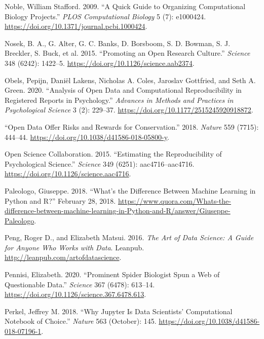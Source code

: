 \documentclass[
]{article}
\newlength{\cslhangindent}
\newenvironment{cslreferences}%
  {\setlength{\parindent}{0pt}%
  \everypar{\setlength{\hangindent}{\cslhangindent}}\ignorespaces}%
  {\par}
\begin{document}
\begin{cslreferences}
\leavevmode\hypertarget{ref-NobleQuickGuideOrganizing2009}{}%
Noble, William Stafford. 2009. ``A Quick Guide to Organizing Computational Biology Projects.'' \emph{PLOS Computational Biology} 5 (7): e1000424. \url{https://doi.org/10.1371/journal.pcbi.1000424}.

\leavevmode\hypertarget{ref-NosekPromotingOpenResearch2015}{}%
Nosek, B. A., G. Alter, G. C. Banks, D. Borsboom, S. D. Bowman, S. J. Breckler, S. Buck, et al. 2015. ``Promoting an Open Research Culture.'' \emph{Science} 348 (6242): 1422--5. \url{https://doi.org/10.1126/science.aab2374}.

\leavevmode\hypertarget{ref-ObelsAnalysisOpenData2020}{}%
Obels, Pepijn, Daniël Lakens, Nicholas A. Coles, Jaroslav Gottfried, and Seth A. Green. 2020. ``Analysis of Open Data and Computational Reproducibility in Registered Reports in Psychology.'' \emph{Advances in Methods and Practices in Psychological Science} 3 (2): 229--37. \url{https://doi.org/10.1177/2515245920918872}.

\leavevmode\hypertarget{ref-OpenDataOffer2018}{}%
``Open Data Offer Risks and Rewards for Conservation.'' 2018. \emph{Nature} 559 (7715): 444--44. \url{https://doi.org/10.1038/d41586-018-05800-y}.

\leavevmode\hypertarget{ref-OpenScienceCollaborationEstimatingReproducibilityPsychological2015}{}%
Open Science Collaboration. 2015. ``Estimating the Reproducibility of Psychological Science.'' \emph{Science} 349 (6251): aac4716--aac4716. \url{https://doi.org/10.1126/science.aac4716}.

\leavevmode\hypertarget{ref-PaleologoWhatDifferenceMachine2018}{}%
Paleologo, Giuseppe. 2018. ``What's the Difference Between Machine Learning in Python and R?'' February 28, 2018. \url{https://www.quora.com/Whats-the-difference-between-machine-learning-in-Python-and-R/answer/Giuseppe-Paleologo}.

\leavevmode\hypertarget{ref-PengArtDataScience2016}{}%
Peng, Roger D., and Elizabeth Matsui. 2016. \emph{The Art of Data Science: A Guide for Anyone Who Works with Data}. Leanpub. \url{http://leanpub.com/artofdatascience}.

\leavevmode\hypertarget{ref-PennisiProminentSpiderBiologist2020}{}%
Pennisi, Elizabeth. 2020. ``Prominent Spider Biologist Spun a Web of Questionable Data.'' \emph{Science} 367 (6478): 613--14. \url{https://doi.org/10.1126/science.367.6478.613}.

\leavevmode\hypertarget{ref-PerkelWhyJupyterData2018}{}%
Perkel, Jeffrey M. 2018. ``Why Jupyter Is Data Scientists' Computational Notebook of Choice.'' \emph{Nature} 563 (October): 145. \url{https://doi.org/10.1038/d41586-018-07196-1}.


\end{cslreferences}
\end{document}
